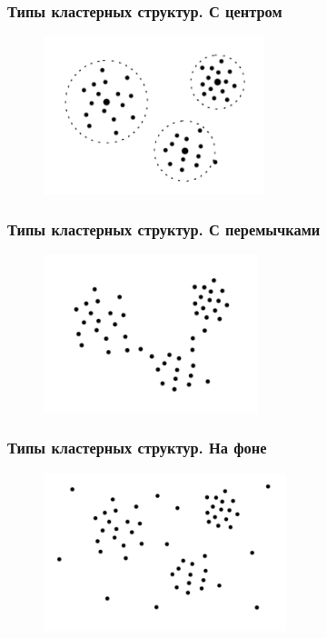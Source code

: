 \documentclass[12pt]{beamer}
\begin{document}
\begin{frame}\frametitle{Типы кластерных структур. С центром}
\begin{figure}[htbp]
  \includegraphics[height=130pt, keepaspectratio = true]{images/cluster3}  
\end{figure}
\end{frame}

\begin{frame}\frametitle{Типы кластерных структур. С перемычками}
\begin{figure}[htbp]
  \includegraphics[height=130pt, keepaspectratio = true]{images/cluster4}  
\end{figure}
\end{frame}

\begin{frame}\frametitle{Типы кластерных структур. На фоне}
\begin{figure}[htbp]
  \includegraphics[height=130pt, keepaspectratio = true]{images/cluster5}  
\end{figure}
\end{frame}
\end{document}
